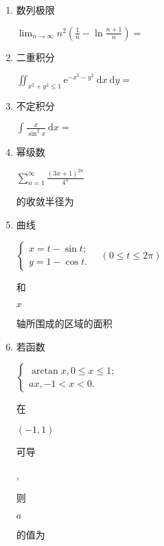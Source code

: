 \documentclass[10pt]{article}
\begin{document}
\begin{enumerate}
  \item \begin{CJK}{UTF8}{mj}数列极限\end{CJK} $\lim _{n \rightarrow \infty} n^{2}\left(\frac{1}{n}-\ln \frac{n+1}{n}\right)=$

  \item \begin{CJK}{UTF8}{mj}二重积分\end{CJK} $\iint_{x^{2}+y^{2} \leqslant 1} \mathrm{e}^{-x^{2}-y^{2}} \mathrm{~d} x \mathrm{~d} y=$

  \item \begin{CJK}{UTF8}{mj}不定积分\end{CJK} $\int \frac{x}{\sin ^{2} x} \mathrm{~d} x=$

  \item \begin{CJK}{UTF8}{mj}幂级数\end{CJK} $\sum_{n=1}^{\infty} \frac{(3 x+1)^{2 n}}{4^{n}}$ \begin{CJK}{UTF8}{mj}的收敛半径为\end{CJK}

  \item \begin{CJK}{UTF8}{mj}曲线\end{CJK} $\left\{\begin{array}{l}x=t-\sin t ; \\ y=1-\cos t .\end{array} \quad(0 \leqslant t \leqslant 2 \pi)\right.$ \begin{CJK}{UTF8}{mj}和\end{CJK} $x$ \begin{CJK}{UTF8}{mj}轴所围成的区域的面积\end{CJK}

  \item \begin{CJK}{UTF8}{mj}若函数\end{CJK} $\left\{\begin{array}{l}\arctan x, 0 \leqslant x \leqslant 1 ; \\ a x,-1<x<0 .\end{array}\right.$ \begin{CJK}{UTF8}{mj}在\end{CJK} $(-1,1)$ \begin{CJK}{UTF8}{mj}可导\end{CJK}, \begin{CJK}{UTF8}{mj}则\end{CJK} $a$ \begin{CJK}{UTF8}{mj}的值为\end{CJK}


\end{enumerate}
\end{document}
